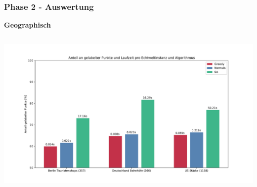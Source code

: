 \documentclass[aspectratio=169]{beamer}
\begin{document}

\begin{frame}
	\frametitle{Phase 2 - Auswertung}
	\textbf{Geographisch}
	\begin{columns}[c] %
		
		\centering \includegraphics[scale=.38]{barplot.pdf}\\
		
	
	\end{columns}
	\end{frame}
	
\end{document}
